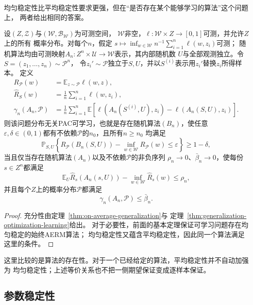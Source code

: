 均匀稳定性比平均稳定性要求更强，但在“是否存在某个能够学习的算法”这个问题上，
两者给出相同的答案。

\begin{theorem}[一般学习基本定理的平均稳定性形式]
\label{thm:average-stability-characterization}
设$(Z,\mathcal Z)$与$(\mathcal W,\mathcal B_{\mathcal W})$为可测空间，
$\mathcal W$非空，$\ell:\mathcal W\times Z\to[0,1]$可测，并允许$Z$上的所有
概率分布。对每个$n$，假定
$s\mapsto\inf_{w\in\mathcal W}n^{-1}\sum_{i=1}^n\ell(w,z_i)$可测；
随机算法均由可测映射$A_n:Z^n\times\mathcal U\to\mathcal W$表示，其内部随机数
$U$与全部观测独立。令$S=(z_1,\ldots,z_n)\sim\mathcal P^n$，
令$z_i'\sim\mathcal P$独立于$S,U$，并以$S^{(i)}$表示用$z_i'$替换$z_i$所得样本。
定义
\[
\begin{aligned}
 R_{\mathcal P}(w)
 &=\mathbb E_{z\sim\mathcal P}\ell(w,z),\\
 \hat R_S(w)
 &=\frac1n\sum_{i=1}^n\ell(w,z_i),\\
 \gamma_n(A_n,\mathcal P)
 &=\frac1n\sum_{i=1}^n\mathbb E\!\left[
   \ell(A_n(S^{(i)},U),z_i)-\ell(A_n(S,U),z_i)\right].
\end{aligned}
\]
则该问题分布无关PAC可学习，也就是存在随机算法$(B_n)$，使任意
$\varepsilon,\delta\in(0,1)$都有不依赖$\mathcal P$的$n_0$，且所有$n\geq n_0$
均满足
\[
 \mathbb P_{S,U}\!\left\{
 R_{\mathcal P}(B_n(S,U))-\inf_{w\in\mathcal W}R_{\mathcal P}(w)
 \leq\varepsilon\right\}\geq1-\delta,
\]
当且仅当存在随机算法$(A_n)$以及不依赖$\mathcal P$的非负序列
$\rho_n\to0$、$\bar\beta_n\to0$，使每份$s\in Z^n$都满足
\[
 \mathbb E_U\hat R_s(A_n(s,U))
 -\inf_{w\in\mathcal W}\hat R_s(w)\leq\rho_n,
\]
并且每个$Z$上的概率分布$\mathcal P$都满足
\[
 \gamma_n(A_n,\mathcal P)\leq\bar\beta_n.
\]
\end{theorem}
\begin{proof}
充分性由定理~\ref{thm:on-average-generalization}与
定理~\ref{thm:generalization-optimization-learning}给出。
对于必要性，前面的基本定理保证可学习问题存在均匀稳定的始终AERM算法；
均匀稳定性又蕴含平均稳定性，因此同一个算法满足这里的条件。
\end{proof}

这里比较的是算法的存在性。对于一个已经给定的算法，平均稳定性并不自动加强为
均匀稳定性；上述等价关系也不把一侧期望保证变成逐样本保证。

\subsection{参数稳定性}
\label{sec:parameter-stability}


